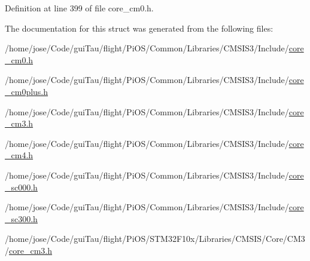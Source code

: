 Definition at line 399 of file core\-\_\-cm0.\-h.



The documentation for this struct was generated from the following files\-:\begin{DoxyCompactItemize}
\item 
/home/jose/\-Code/gui\-Tau/flight/\-Pi\-O\-S/\-Common/\-Libraries/\-C\-M\-S\-I\-S3/\-Include/\hyperlink{core__cm0_8h}{core\-\_\-cm0.\-h}\item 
/home/jose/\-Code/gui\-Tau/flight/\-Pi\-O\-S/\-Common/\-Libraries/\-C\-M\-S\-I\-S3/\-Include/\hyperlink{core__cm0plus_8h}{core\-\_\-cm0plus.\-h}\item 
/home/jose/\-Code/gui\-Tau/flight/\-Pi\-O\-S/\-Common/\-Libraries/\-C\-M\-S\-I\-S3/\-Include/\hyperlink{_common_2_libraries_2_c_m_s_i_s3_2_include_2core__cm3_8h}{core\-\_\-cm3.\-h}\item 
/home/jose/\-Code/gui\-Tau/flight/\-Pi\-O\-S/\-Common/\-Libraries/\-C\-M\-S\-I\-S3/\-Include/\hyperlink{core__cm4_8h}{core\-\_\-cm4.\-h}\item 
/home/jose/\-Code/gui\-Tau/flight/\-Pi\-O\-S/\-Common/\-Libraries/\-C\-M\-S\-I\-S3/\-Include/\hyperlink{core__sc000_8h}{core\-\_\-sc000.\-h}\item 
/home/jose/\-Code/gui\-Tau/flight/\-Pi\-O\-S/\-Common/\-Libraries/\-C\-M\-S\-I\-S3/\-Include/\hyperlink{core__sc300_8h}{core\-\_\-sc300.\-h}\item 
/home/jose/\-Code/gui\-Tau/flight/\-Pi\-O\-S/\-S\-T\-M32\-F10x/\-Libraries/\-C\-M\-S\-I\-S/\-Core/\-C\-M3/\hyperlink{_s_t_m32_f10x_2_libraries_2_c_m_s_i_s_2_core_2_c_m3_2core__cm3_8h}{core\-\_\-cm3.\-h}\end{DoxyCompactItemize}
